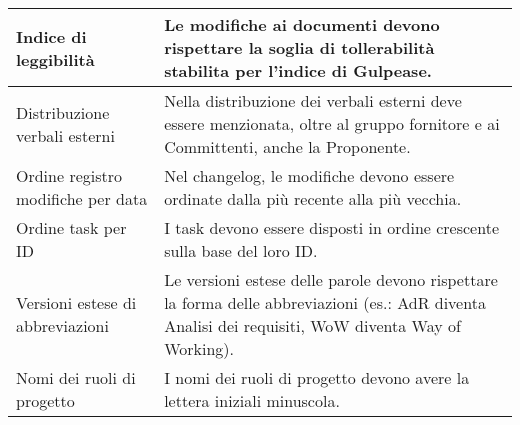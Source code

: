 \begin{adjustwidth}{-0.5cm}{-0.5cm}
\begin{longtable}{|P{3cm}|>{\raggedright\arraybackslash}P{9.5cm}|}
    \hline Indice di leggibilità & Le modifiche ai documenti devono rispettare la soglia di tollerabilità stabilita per l'indice di Gulpease.\\
    \hline Distribuzione verbali esterni & Nella distribuzione dei verbali esterni deve essere menzionata, oltre al gruppo fornitore e ai Committenti, anche la Proponente.\\
    \hline Ordine registro modifiche per data & Nel changelog, le modifiche devono essere ordinate dalla più recente alla più vecchia.\\
    \hline Ordine task per ID & I task devono essere disposti in ordine crescente sulla base del loro ID. \\
    \hline Versioni estese di abbreviazioni & Le versioni estese delle parole devono rispettare la forma delle abbreviazioni (es.: AdR diventa Analisi dei requisiti, WoW diventa Way of Working). \\
    \hline Nomi dei ruoli di progetto & I nomi dei ruoli di progetto devono avere la lettera iniziali minuscola. \\
  \end{longtable}
\end{adjustwidth}
\egroup

